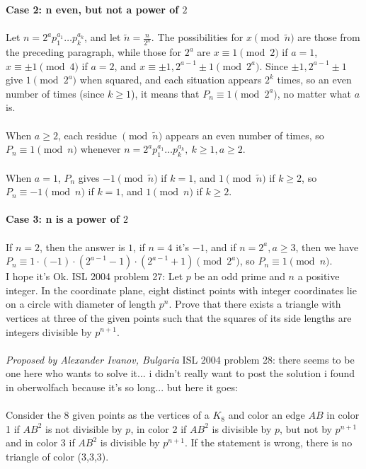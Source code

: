 \textbf{Case 2: n even, but not a power of $2$} \\\\
Let $n=2^ap_1^{a_1}\ldots p_k^{a_k}$, and let $\tilde n=\frac n{2^n}$. The possibilities for $x\pmod{\tilde n}$ are those from the preceding paragraph, while those for $2^a$ are $x\equiv 1\pmod 2$ if $a=1$, $x\equiv \pm1\pmod 4$ if $a=2$, and $x\equiv \pm 1,2^{a-1}\pm 1\pmod{2^a}$. Since $\pm 1,2^{a-1}\pm 1$ give $1\pmod{2^a}$ when squared, and each situation appears $2^k$ times, so an even number of times (since $k\ge 1$), it means that $P_n\equiv 1\pmod{2^a}$, no matter what $a$ is. \\\\
When $a\ge 2$, each residue $\pmod{\tilde n}$ appears an even number of times, so $P_n\equiv 1\pmod n$ whenever $n=2^ap_1^{a_1}\ldots p_k^{a_k},\ k\ge 1,a\ge 2$. \\\\
When $a=1$, $P_n$ gives $-1\pmod{\tilde n}$ if $k=1$, and $1\pmod{\tilde n}$ if $k\ge 2$, so $P_n\equiv -1\pmod n$ if $k=1$, and $1\pmod n$ if $k\ge 2$. \\\\
\textbf{Case 3: n is a power of $2$} \\\\
If $n=2$, then the answer is $1$, if $n=4$ it's $-1$, and if $n=2^a,a\ge 3$, then we have $P_n\equiv 1\cdot(-1)\cdot(2^{a-1}-1)\cdot(2^{a-1}+1)\pmod{2^a}$, so $P_n\equiv 1\pmod n$. \\
I hope it's Ok. 
ISL 2004 problem 27:  Let $p$ be an odd prime and $n$ a positive integer. In the coordinate plane, eight distinct points with integer coordinates lie on a circle with diameter of length $p^n$. Prove that there exists a triangle with vertices at three of the given points such that the squares of its side lengths are integers divisible by $p^{n+1}$. \\\\
\textit{Proposed by Alexander Ivanov, Bulgaria} 
ISL 2004 problem 28:  there seems to be one here who wants to solve it... i didn't really want to post the solution i found in oberwolfach because it's so long... but here it goes: \\\\
Consider the 8 given points as the vertices of a $K_8$ and color an edge $AB$ in color 1 if $AB^2$ is not divisible by $p$, in color 2 if $AB^2$ is divisible by $p$, but not by $p^{n+1}$ and in color 3 if $AB^2$ is divisible by $p^{n+1}$. If the statement is wrong, there is no triangle of color (3,3,3). \\\\
